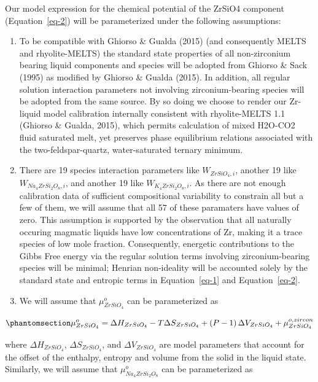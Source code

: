 \documentclass[
]{agujournal2019}
\begin{document}
Our model expression for the chemical potential of the ZrSiO4 component
(Equation~\ref{eq-2}) will be parameterized under the following
assumptions:

\begin{enumerate}
\def\labelenumi{(\arabic{enumi})}
\item
  To be compatible with Ghiorso \& Gualda (2015) (and consequently MELTS
  and rhyolite-MELTS) the standard state properties of all non-zirconium
  bearing liquid components and species will be adopted from Ghiorso \&
  Sack (1995) as modified by Ghiorso \& Gualda (2015). In addition, all
  regular solution interaction parameters not involving
  zirconium-bearing species will be adopted from the same source. By so
  doing we choose to render our Zr-liquid model calibration internally
  consistent with rhyolite-MELTS 1.1 (Ghiorso \& Gualda, 2015), which
  permits calculation of mixed H2O-CO2 fluid saturated melt, yet
  preserves phase equilibrium relations associated with the
  two-feldspar-quartz, water-saturated ternary minimum.
\item
  There are 19 species interaction parameters like \(W_{ZrSiO_4, i}\),
  another 19 like \(W_{Na_4ZrSi_2O_8, i}\), and another 19 like
  \(W_{K_4ZrSi_2O_8, i}\). As there are not enough calibration data of
  sufficient compositional variability to constrain all but a few of
  them, we will assume that all 57 of these paramaters have values of
  zero. This assumption is supported by the observation that all
  naturally occuring magmatic liquids have low concentrations of Zr,
  making it a trace species of low mole fraction. Consequently,
  energetic contributions to the Gibbs Free energy via the regular
  solution terms involving zirconium-bearing species will be minimal;
  Henrian non-ideality will be accounted solely by the standard state
  and entropic terms in Equation~\ref{eq-1} and Equation~\ref{eq-2}.
\item
  We will assume that \(\mu_{ZrSiO_4}^{o}\) can be parameterized as
\end{enumerate}

\begin{equation}\phantomsection\label{eq-5}{
\mu_{ZrSiO_4}^{o} = \Delta H_{ZrSiO_4} - T \Delta S_{ZrSiO_4} + \left( P - 1 \right) \Delta V_{ZrSiO_4} + \mu_{ZrSiO_4}^{o,zircon}
}\end{equation}

where \(\Delta H_{ZrSiO_4}\), \(\Delta S_{ZrSiO_4}\), and
\(\Delta V_{ZrSiO_4}\) are model parameters that account for the offset
of the enthalpy, entropy and volume from the solid in the liquid state.
Similarly, we will assume that \(\mu_{Na_4ZrSi_2O_8}^{o}\) can be
parameterized as
\end{document}

